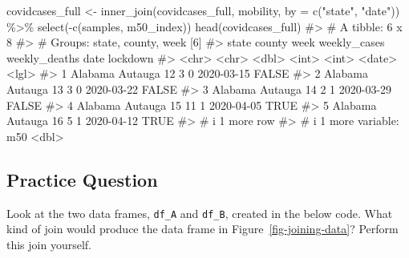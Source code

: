\documentclass[
  letterpaper,
]{krantz}
\makeatletter
\newenvironment{Shaded}{\begin{snugshade}}{\end{snugshade}}
\newcommand{\AttributeTok}[1]{\textcolor[rgb]{0.40,0.45,0.13}{#1}}
\newcommand{\CommentTok}[1]{\textcolor[rgb]{0.37,0.37,0.37}{#1}}
\newcommand{\FunctionTok}[1]{\textcolor[rgb]{0.28,0.35,0.67}{#1}}
\newcommand{\NormalTok}[1]{\textcolor[rgb]{0.00,0.23,0.31}{#1}}
\newcommand{\OtherTok}[1]{\textcolor[rgb]{0.00,0.23,0.31}{#1}}
\newcommand{\SpecialCharTok}[1]{\textcolor[rgb]{0.37,0.37,0.37}{#1}}
\newcommand{\StringTok}[1]{\textcolor[rgb]{0.13,0.47,0.30}{#1}}
\newenvironment{kframe}{%
\medskip{}
\setlength{\fboxsep}{.8em}
 \def\at@end@of@kframe{}%
 \ifinner\ifhmode%
  \def\at@end@of@kframe{\end{minipage}}%
  \begin{minipage}{\columnwidth}%
 \fi\fi%
 \def\FrameCommand##1{\hskip\@totalleftmargin \hskip-\fboxsep
 \colorbox{shadecolor}{##1}\hskip-\fboxsep
     \hskip-\linewidth \hskip-\@totalleftmargin \hskip\columnwidth}%
 \MakeFramed {\advance\hsize-\width
   \@totalleftmargin\z@ \linewidth\hsize
   \@setminipage}}%
 {\par\unskip\endMakeFramed%
 \at@end@of@kframe}
\renewenvironment{Shaded}{\begin{kframe}}{\end{kframe}}
\makeatother
\begin{document}
\begin{Shaded}
\begin{Highlighting}[]
\NormalTok{covidcases\_full }\OtherTok{\textless{}{-}} \FunctionTok{inner\_join}\NormalTok{(covidcases\_full, mobility, }
                              \AttributeTok{by =} \FunctionTok{c}\NormalTok{(}\StringTok{"state"}\NormalTok{, }\StringTok{"date"}\NormalTok{)) }\SpecialCharTok{\%\textgreater{}\%}
  \FunctionTok{select}\NormalTok{(}\SpecialCharTok{{-}}\FunctionTok{c}\NormalTok{(samples, m50\_index))}
\FunctionTok{head}\NormalTok{(covidcases\_full)}
\CommentTok{\#\textgreater{} \# A tibble: 6 x 8}
\CommentTok{\#\textgreater{} \# Groups:   state, county, week [6]}
\CommentTok{\#\textgreater{}   state   county   week weekly\_cases weekly\_deaths date       lockdown}
\CommentTok{\#\textgreater{}   \textless{}chr\textgreater{}   \textless{}chr\textgreater{}   \textless{}dbl\textgreater{}        \textless{}int\textgreater{}         \textless{}int\textgreater{} \textless{}date\textgreater{}     \textless{}lgl\textgreater{}   }
\CommentTok{\#\textgreater{} 1 Alabama Autauga    12            3             0 2020{-}03{-}15 FALSE   }
\CommentTok{\#\textgreater{} 2 Alabama Autauga    13            3             0 2020{-}03{-}22 FALSE   }
\CommentTok{\#\textgreater{} 3 Alabama Autauga    14            2             1 2020{-}03{-}29 FALSE   }
\CommentTok{\#\textgreater{} 4 Alabama Autauga    15           11             1 2020{-}04{-}05 TRUE    }
\CommentTok{\#\textgreater{} 5 Alabama Autauga    16            5             1 2020{-}04{-}12 TRUE    }
\CommentTok{\#\textgreater{} \# i 1 more row}
\CommentTok{\#\textgreater{} \# i 1 more variable: m50 \textless{}dbl\textgreater{}}
\end{Highlighting}
\end{Shaded}

\subsection{Practice Question}\label{practice-question-12}

Look at the two data frames, \texttt{df\_A} and \texttt{df\_B}, created
in the below code. What kind of join would produce the data frame in
Figure~\ref{fig-joining-data}? Perform this join yourself.
\end{document}
